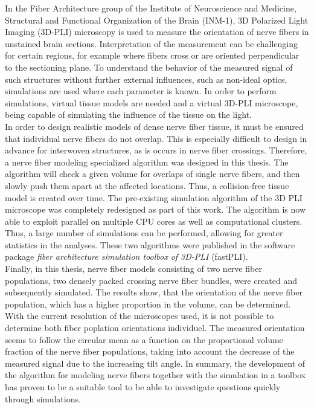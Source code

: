 %
In the Fiber Architecture group of the Institute of Neuroscience and Medicine, Structural and Functional Organization of the Brain (INM-1), 3D Polarized Light Imaging (3D-PLI) microscopy is used to measure the orientation of nerve fibers in unstained brain sections.
Interpretation of the measurement can be challenging for certain regions, for example where fibers cross or are oriented perpendicular to the sectioning plane.
To understand the behavior of the measured signal of such structures without further external influences, such as non-ideal optics, simulations are used where each parameter is known.
In order to perform simulations, virtual tissue models are needed and a virtual 3D-PLI microscope, being capable of simulating the influence of the tissue on the light.
\\
% 
In order to design realistic models of dense nerve fiber tissue, it must be ensured that individual nerve fibers do not overlap.
This is especially difficult to design in advance for interwoven structures, as is occurs in nerve fiber crossings.
Therefore, a nerve fiber modeling specialized algorithm was designed in this thesis.
The algorithm will check a given volume for overlaps of single nerve fibers, and then slowly push them apart at the affected locations.
Thus, a collision-free tissue model is created over time.
The pre-existing simulation algorithm of the 3D PLI microscope was completely redesigned as part of this work.
The algorithm is now able to exploit parallel on multiple CPU cores as well as computational clusters.
Thus, a large number of simulations can be performed, allowing for greater statistics in the analyses.
These two algorithms were published in the software package \textit{fiber architecture simulation toolbox of 3D-PLI} (fastPLI).
\\
% 
Finally, in this thesis, nerve fiber models consisting of two nerve fiber populations, \ie{} two densely packed crossing nerve fiber bundles, were created and subsequently simulated.
The results show, that the orientation of the nerve fiber population, which has a higher proportion in the volume, can be determined.
With the current resolution of the microscopes used, it is not possible to determine both fiber poplation orientations individuel.
The measured orientation seems to follow the circular mean as a function on the proportional volume fraction of the nerve fiber populations, taking into account the decrease of the measured signal due to the increasing tilt angle.
In summary, the development of the algorithm for modeling nerve fibers together with the simulation in a toolbox has proven to be a suitable tool to be able to investigate questions quickly through simulations.
